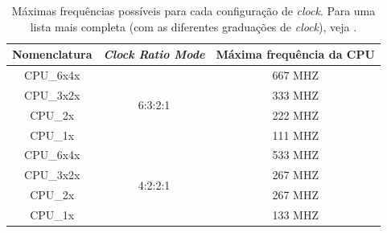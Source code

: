 \begin{table}[ht]
	\centering
	\begin{tabular}{ccc}
		\hline\hline
		Nomenclatura & \emph{Clock Ratio Mode} & Máxima frequência da CPU\\[0.5ex]
		\hline
		CPU\_6x4x & \multirow{4}{*}{6:3:2:1} & 667 MHZ\\
		CPU\_3x2x &                          & 333 MHZ\\
		CPU\_2x   &                          & 222 MHZ\\
		CPU\_1x   &                          & 111 MHZ\\
		\hline
		CPU\_6x4x & \multirow{4}{*}{4:2:2:1} & 533 MHZ\\
		CPU\_3x2x &                          & 267 MHZ\\
		CPU\_2x   &                          & 267 MHZ\\
		CPU\_1x   &                          & 133 MHZ\\[1ex]
		\hline
	\end{tabular}
	\caption{Máximas frequências possíveis para cada configuração de \emph{clock}. Para uma lista mais completa (com as diferentes graduações de \emph{clock}), veja \cite[p.~13]{data_sheet}.}
	\label{tab:clocks}
\end{table}













